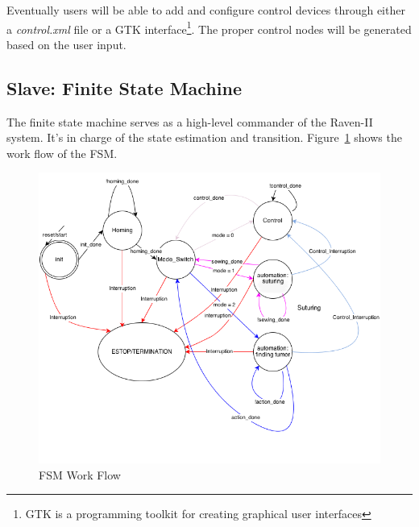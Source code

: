 \documentclass[letterpaper,twocolumn,10pt]{article}
\begin{document}
Eventually users will be able to add and configure control devices
through either a \emph{control.xml} file or a GTK
interface\footnote{GTK is a programming toolkit for creating graphical
  user interfaces}. The proper control nodes will be generated based
on the user input.

\subsection{Slave: Finite State Machine}

The finite state machine serves as a high-level commander of the
Raven-II system. It's in charge of the state estimation and
transition. Figure~\ref{fig:fsm_workflow} shows the work flow of the FSM.

\begin{figure}[h]
  \includegraphics[width=1.0\columnwidth]{FSM.png}
  \caption{FSM Work Flow}
  \label{fig:fsm_workflow}
\end{figure}
\end{document}
